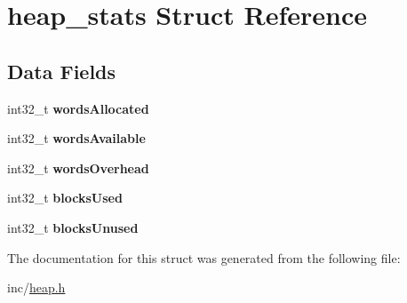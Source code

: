 \hypertarget{structheap__stats}{}\section{heap\+\_\+stats Struct Reference}
\label{structheap__stats}
\subsection*{Data Fields}
\begin{DoxyCompactItemize}
\item 
int32\+\_\+t {\bfseries words\+Allocated}\hypertarget{structheap__stats_a0399cad6a3b81cc8542f888f9f258bb9}{}\label{structheap__stats_a0399cad6a3b81cc8542f888f9f258bb9}

\item 
int32\+\_\+t {\bfseries words\+Available}\hypertarget{structheap__stats_a284f1c9ea8a59a189cd589815abf5760}{}\label{structheap__stats_a284f1c9ea8a59a189cd589815abf5760}

\item 
int32\+\_\+t {\bfseries words\+Overhead}\hypertarget{structheap__stats_ad2f66b64f88f7e1535ea8b1721c587ef}{}\label{structheap__stats_ad2f66b64f88f7e1535ea8b1721c587ef}

\item 
int32\+\_\+t {\bfseries blocks\+Used}\hypertarget{structheap__stats_a86c4196c97770ce9ab700f1425e5eff1}{}\label{structheap__stats_a86c4196c97770ce9ab700f1425e5eff1}

\item 
int32\+\_\+t {\bfseries blocks\+Unused}\hypertarget{structheap__stats_adc615ee1448dbcbb8ef95e6a42228dbf}{}\label{structheap__stats_adc615ee1448dbcbb8ef95e6a42228dbf}

\end{DoxyCompactItemize}


The documentation for this struct was generated from the following file\+:\begin{DoxyCompactItemize}
\item 
inc/\hyperlink{heap_8h}{heap.\+h}\end{DoxyCompactItemize}
